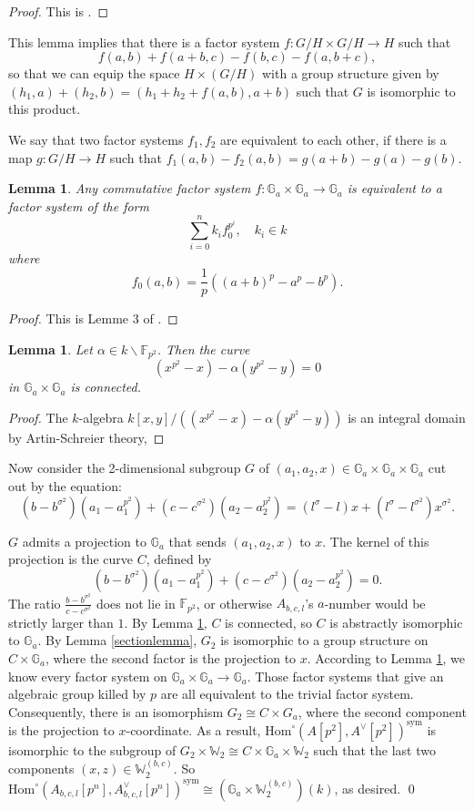 \documentclass[a4paper,12pt,twoside]{report}
\newtheorem{lemma}[theorem]{Lemma}
\newcommand{\F}{\mathbb{F}}
\newcommand{\G}{\mathbb{G}}
\newcommand{\Hom}{\mathrm{Hom}}
\newcommand{\W}{\mathbb{W}}
\newcommand{\sym}{\mathrm{sym}}
\begin{document}
\begin{proof}
    This is \cite[Proposition 2.3.4]{Ros}.
\end{proof}

This lemma implies that there is a factor system $f: G/H\times G/H \rightarrow H$ such that 
\[f(a,b)+f(a+b,c)-f(b,c)-f(a,b+c),\]
so that we can equip the space $H\times (G/H)$ with a group structure given by
$(h_1,a)+(h_2,b)=(h_1+h_2+f(a,b),a+b)$
such that $G$ is isomorphic to this product. 

We say that two factor systems $f_1,f_2$ are equivalent to each other, 
if there is a map $g: G/H\rightarrow H$ such that $f_1(a,b)-f_2(a,b)=g(a+b)-g(a)-g(b)$. 

\begin{lemma}\label{Serrelemma}
    Any commutative factor system $f:\G_a\times \G_a\rightarrow \G_a$ 
    is equivalent to a factor system of the form 
    \[\sum_{i=0}^n k_if_0^{p^i}, \quad k_i\in k\] where \[f_0(a,b)=\frac{1}{p}((a+b)^p-a^p-b^p).\] 
\end{lemma}
\begin{proof}
    This is Lemme 3 of \cite{Lar}. 
\end{proof}

\begin{lemma}\label{connected}
    Let $\alpha\in k\backslash{\F_{p^2}}$. Then the curve 
    \[(x^{p^2}-x)-\alpha(y^{p^2}-y)=0\]
    in $\G_a\times \G_a$ is connected. 
\end{lemma}
\begin{proof}
    The $k$-algebra 
$k[x,y]/((x^{p^2}-x)-\alpha(y^{p^2}-y))$ is an integral domain by Artin-Schreier theory, 
\end{proof}

Now consider the 2-dimensional subgroup $G$ of $(a_{1},a_{2},x)\in \G_a\times \G_a\times \G_a$ cut out by the equation: 
\[(b-b^{\sigma^2})(a_{1}-a_{1}^{p^2})+(c-c^{\sigma^2})(a_{2}-a_{2}^{p^2})=(l^\sigma-l)x+(l^\sigma-l^{\sigma^2})x^{\sigma^2}.\]

$G$ admits a projection to $\G_a$ that sends $(a_{1},a_{2},x)$ to $x$. 
The kernel of this projection is the curve $C$, defined by 
\[(b-b^{\sigma^2})(a_{1}-a_{1}^{p^2})+(c-c^{\sigma^2})(a_{2}-a_{2}^{p^2})=0.\]
The ratio $\frac{b-b^{\sigma^2}}{c-c^{\sigma^2}}$ does not lie in $\F_{p^2}$, or otherwise $A_{b,c,l}$'s $a$-number 
would be strictly larger than $1$.  
By Lemma \ref{connected}, $C$ is connected, so $C$ is abstractly isomorphic to $\G_a$. 
By Lemma \ref{sectionlemma}, $G_2$ is isomorphic to a group structure on $C\times \G_a$, 
where the second factor is the projection to $x$. 
According to Lemma \ref{Serrelemma}, we know every factor system on $\G_a\times \G_a\rightarrow \G_a$. 
Those factor systems that give an algebraic group killed by $p$ are all equivalent to the trivial factor system. 
Consequently, there is an isomorphism $G_2\cong C\times G_a$, where the second component is the projection to $x$-coordinate. 
As a result, $\Hom^{\circ}(A[p^2],A^{\vee}[p^2])^{\sym}$ is isomorphic to the subgroup of $G_2\times \W_2\cong C\times \G_a\times \W_2$ 
such that the last two components $(x,z)\in \W_2^{(b,c)}$. 
So $\Hom^{\circ}(A_{b,c,l}[p^n],A_{b,c,l}^{\vee}[p^n])^{\sym}\cong (\G_a\times \W_2^{(b,c)})(k)$, as desired. \qed
\end{document}

